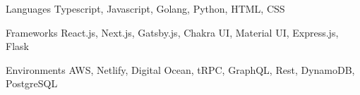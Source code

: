 

\begin{cvskills}

  \cvskill
    {Languages} %
    {Typescript, Javascript, Golang, Python, HTML, CSS} %

  \cvskill
    {Frameworks} %
    {React.js, Next.js, Gatsby.js, Chakra UI, Material UI, Express.js, Flask} %

  \cvskill
    {Environments} %
    {AWS, Netlify, Digital Ocean, tRPC, GraphQL, Rest, DynamoDB,  PostgreSQL} %

\end{cvskills}
